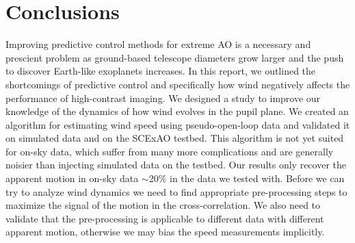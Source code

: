 \section{Conclusions} \label{sec:conclusions}

Improving predictive control methods for extreme AO is a necessary and prescient problem as ground-based telescope diameters grow larger and the push to discover Earth-like exoplanets increases. In this report, we outlined the shortcomings of predictive control and specifically how wind negatively affects the performance of high-contrast imaging. We designed a study to improve our knowledge of the dynamics of how wind evolves in the pupil plane. We created an algorithm for estimating wind speed using pseudo-open-loop data and validated it on simulated data and on the SCExAO testbed. This algorithm is not yet suited for on-sky data, which suffer from many more complications and are generally noisier than injecting simulated data on the testbed. Our results only recover the apparent motion in on-sky data $\sim$20\% in the data we tested with. Before we can try to analyze wind dynamics we need to find appropriate pre-processing steps to maximize the signal of the motion in the cross-correlation. We also need to validate that the pre-processing is applicable to different data with different apparent motion, otherwise we may bias the speed measurements implicitly.